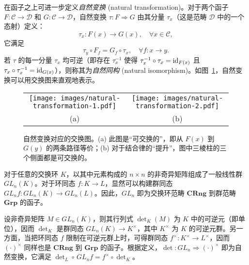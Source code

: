 在函子之上可进一步定义\emph{自然变换} (natural transformation)。对于两个函子 $F\colon\mathcal{C}\to\mathcal{D}$ 和 $G\colon\mathcal{C}\to\mathcal{D}$，自然变换 $\tau\colon F\Rightarrow G$ 由其分量 $\tau_x$（这是范畴 $\mathcal{D}$ 中的一个态射）定义：
\begin{equation}
  \tau_x\colon F(x)\to G(x), \quad \forall x\in\mathcal{C},
\end{equation}
它满足
\begin{equation}
  \tau_y \circ F_f = G_f \circ \tau_x, \quad \forall f\colon x\to y.
\end{equation}
若 $\tau$ 的每一分量 $\tau_x$ 均可逆（即存在 $\tau_x^{-1}$ 使得 $\tau^{-1}_x\circ\tau_x=\mathrm{id}_{F(x)}$ 且 $\tau_x\circ\tau^{-1}_x = \mathrm{id}_{G(x)}$），则称其为\emph{自然同构} (natural isomorphism)。如图~\ref{fig:natural-transformation}，自然变换可以用交换图来直观地表示。

\begin{figure}[htb]
  \centering
  \begin{tabular}{c@{\qquad}c}
    \texttt{[image: images/natural-transformation-1.pdf]} &
    \texttt{[image: images/natural-transformation-2.pdf]} \\
    (a) & (b)
  \end{tabular}
  \caption[自然变换对应的交换图]{自然变换对应的交换图。(a) 此图是“可交换的”，即从 $F(x)$ 到 $G(y)$ 的两条路径等价；(b) 对于结合律的“提升”，图中三棱柱的三个侧面都是可交换的。}
  \label{fig:natural-transformation}
\end{figure}

\begin{example}
  对于任意的交换环 $K$，以其中元素构成的 $n\times n$ 的非奇异矩阵组成了一般线性群 $GL_n(K)$。对于环同态 $f\colon K\to L$，显然可以构建群同态 $GL_n f\colon GL_n(K)\to GL_n(L)$。因此，$GL_n$ 即为交换环范畴 $\mathbf{CRng}$ 到群范畴 $\mathbf{Grp}$ 的函子。

  设非奇异矩阵 $M\in GL_n(K)$，则其行列式 $\det_K(M)$ 为 $K$ 中的可逆元（即单位），因而 $\det_K$ 是群同态 $GL_n(K)\to K^\times$，其中 $K^\times$ 为 $K$ 的可逆元群。另一方面，当把环同态 $f$ 限制在可逆元群上时，可得群同态 $f^\times\colon K^\times\to L^\times$，因而 $(\cdot)^\times$ 同样也是 $\mathbf{CRng}$ 到 $\mathbf{Grp}$ 的函子。根据定义，$\det\colon GL_n\Rightarrow(\cdot)^\times$ 即为自然变换，它满足 $\det_L\circ\,GL_n f=f^\times\circ \det_K$。
\end{example}


